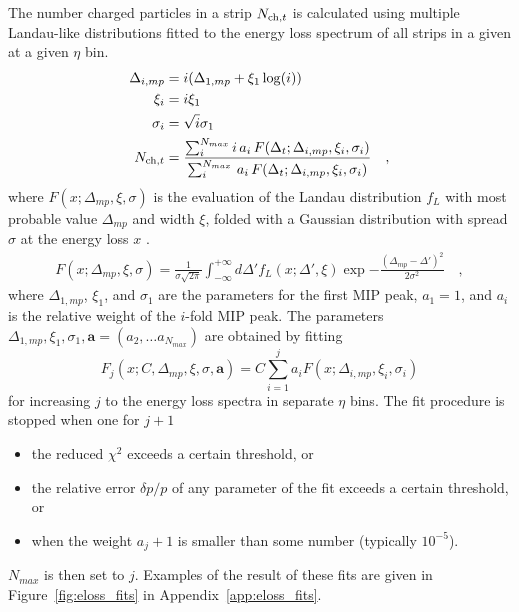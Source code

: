 \documentclass[11pt]{article}
\newcommand{\mult}[1][]{\ensuremath N_{\text{ch}#1}}
\newcommand{\figref}[1]{Figure~\ref{#1}}
\begin{document}
The number charged particles in a strip $\mult[,t]$ is calculated
using multiple Landau-like distributions fitted to the energy loss
spectrum of all strips in a given at a given $\eta$ bin.
\begin{align}
  \Delta_{i,mp} &= i (\Delta_{1,mp}+ \xi_1 \log(i))\nonumber\\
  \xi_i         &= i\xi_1\nonumber\\
  \sigma_i      &= \sqrt{i}\sigma_1\nonumber\\
  \mult[,t]     &= \frac{\sum_i^{N_{max}}
    i\,a_i\,F(\Delta_t;\Delta_{i,mp},\xi_i,\sigma_i)}{
    \sum_i^{N_{max}}\,a_i\,F(\Delta_t;\Delta_{i,mp},\xi_i,\sigma_i)}\quad,
\end{align}
where $F(x;\Delta_{mp},\xi,\sigma)$ is the evaluation of the Landau
distribution $f_L$ with most probable value $\Delta_{mp}$ and width
$\xi$, folded with a Gaussian distribution with spread $\sigma$ at the
energy loss $x$ \cite{nim:b1:16,phyrev:a28:615}.
\begin{align}
  \label{eq:energy_response}
  F(x;\Delta_{mp},\xi,\sigma) = \frac{1}{\sigma \sqrt{2 \pi}}
  \int_{-\infty}^{+\infty} d\Delta' f_{L}(x;\Delta',\xi)
  \exp{-\frac{(\Delta_{mp}-\Delta')^2}{2\sigma^2}}\quad,
\end{align}
where $\Delta_{1,mp}$, $\xi_1$, and $\sigma_1$ are the parameters for
the first MIP peak, $a_1=1$, and $a_i$ is the relative weight of the
$i$-fold MIP peak.  The parameters $\Delta_{1,mp}, \xi_1,
\sigma_1, \mathbf{a} = \left(a_2, \ldots a_{N_{max}}\right)$ are
obtained by fitting 
$$
F_j(x;C,\Delta_{mp},\xi,\sigma,\mathbf{a}) = C 
\sum_{i=1}^{j} a_i F(x;\Delta_{i,mp},\xi_{i},\sigma_i) 
$$
for increasing $j$ to the energy loss spectra in separate $\eta$ bins.
The fit procedure is stopped when one for $j+1$ 
\begin{itemize}
\item the reduced $\chi^2$ exceeds a certain threshold, or
\item the relative error $\delta p/p$ of any parameter of the fit
  exceeds a certain threshold, or 
\item when the weight $a_j+1$ is smaller than some number (typically
  $10^{-5}$). 
\end{itemize}
$N_{max}$ is then set to $j$.  Examples of the result of these fits
are given in \figref{fig:eloss_fits} in Appendix~\ref{app:eloss_fits}.
\end{document}
